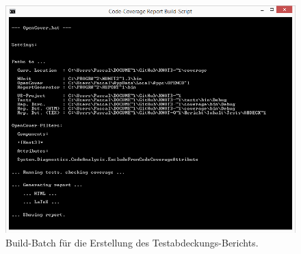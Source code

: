 \begin{figure}[ht]

	\centering
	
	\includegraphics[width=\textwidth]{Inhalt/Anhang/Grafiken/Werkzeuge/Code-Coverage Report Build-Script.png}
	
	\caption{Build-Batch für die Erstellung des Testabdeckungs-Berichts.}

\end{figure}








